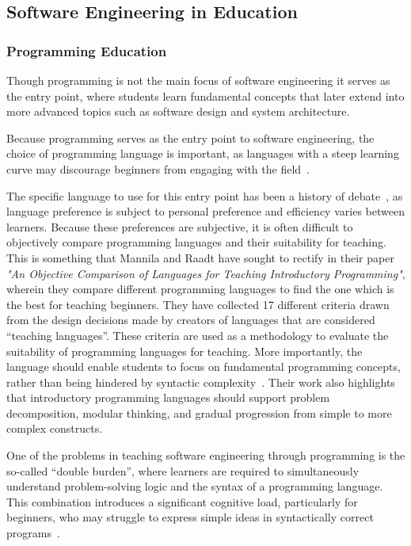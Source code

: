 \subsection{Software Engineering in Education}

\subsubsection{Programming Education}\label{subsub:programming-edu}
Though programming is not the main focus of software engineering it serves as the entry point, where students learn fundamental concepts that later extend into more advanced topics such as software design and system architecture.

Because programming serves as the entry point to software engineering, the choice of programming language is important, as languages with a steep learning curve may discourage beginners from engaging with the field~\cite{resnick_scratch_2009}.

The specific language to use for this entry point has been a history of debate~\cite{villagomez-palacios_bridging_2025}, as language preference is subject to personal preference and efficiency varies between learners.
Because these preferences are subjective, it is often difficult to objectively compare programming languages and their suitability for teaching.
This is something that Mannila and Raadt have sought to rectify in their paper \textit{ "An Objective Comparison of Languages for Teaching Introductory Programming"}\cite{mannila_objective_2006}, wherein they compare different programming languages to find the one which is the best for teaching beginners.
They have collected 17 different criteria drawn from the design decisions made by creators of languages that are considered ``teaching languages''.
These criteria are used as a methodology to evaluate the suitability of programming languages for teaching.
More importantly, the language should enable students to focus on fundamental programming concepts, rather than being hindered by syntactic complexity~\cite{villagomez-palacios_bridging_2025, mannila_objective_2006}.
Their work also highlights that introductory programming languages should support problem decomposition, modular thinking, and gradual progression from simple to more complex constructs.

One of the problems in teaching software engineering through programming is the so-called “double burden”, where learners are required to simultaneously understand problem-solving logic and the syntax of a programming language.
This combination introduces a significant cognitive load, particularly for beginners, who may struggle to express simple ideas in syntactically correct programs~\cite{villagomez-palacios_bridging_2025}.

